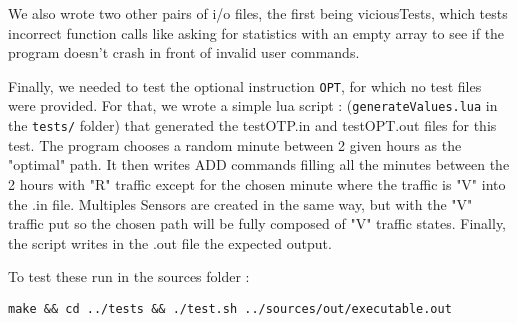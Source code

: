 \documentclass[10pt]{article}
\begin{document}
We also wrote two other pairs of i/o files, the first being viciousTests, which tests incorrect function calls like asking for statistics with an empty array to see if the program doesn't crash in front of invalid user commands.

Finally, we needed to test the optional instruction \texttt{OPT}, for which no test files were provided. For that, we wrote a simple lua script : (\texttt{generateValues.lua} in the \texttt{tests/} folder) that generated the testOTP.in and testOPT.out files for this test. The program chooses a random minute between 2 given hours as the "optimal" path. It then writes ADD commands filling all the minutes between the 2 hours with "R" traffic except for the chosen minute where the traffic is "V" into the .in file. Multiples Sensors are created in the same way, but with the "V" traffic put so the chosen path will be fully composed of "V" traffic states. Finally, the script writes in the .out file the expected output.

To test these run in the sources folder :

\texttt{make \&\& cd ../tests \&\& ./test.sh ../sources/out/executable.out}
\end{document}
